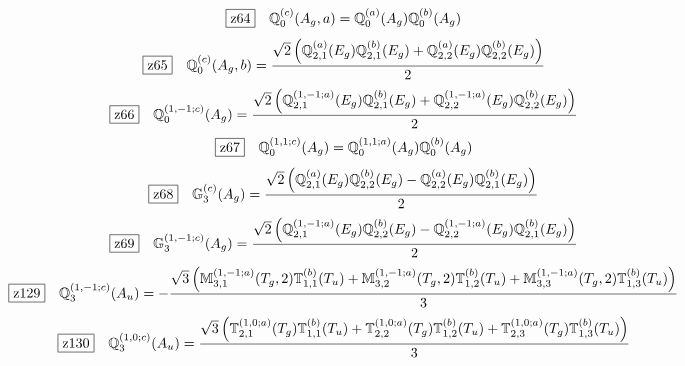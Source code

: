 \documentclass[fleqn,10pt,landscape]{jsarticle}
\begin{document}
\begin{dmath*}
\hspace*{3mm}\fbox{z64}\quad \mathbb{Q}_{0}^{(c)}(A_{g},a)=\mathbb{Q}_{0}^{(a)}(A_{g}) \mathbb{Q}_{0}^{(b)}(A_{g})
\end{dmath*}
\begin{dmath*}
\hspace*{3mm}\fbox{z65}\quad \mathbb{Q}_{0}^{(c)}(A_{g},b)=\frac{\sqrt{2} \left(\mathbb{Q}_{2,1}^{(a)}(E_{g}) \mathbb{Q}_{2,1}^{(b)}(E_{g}) + \mathbb{Q}_{2,2}^{(a)}(E_{g}) \mathbb{Q}_{2,2}^{(b)}(E_{g})\right)}{2}
\end{dmath*}
\begin{dmath*}
\hspace*{3mm}\fbox{z66}\quad \mathbb{Q}_{0}^{(1,-1;c)}(A_{g})=\frac{\sqrt{2} \left(\mathbb{Q}_{2,1}^{(1,-1;a)}(E_{g}) \mathbb{Q}_{2,1}^{(b)}(E_{g}) + \mathbb{Q}_{2,2}^{(1,-1;a)}(E_{g}) \mathbb{Q}_{2,2}^{(b)}(E_{g})\right)}{2}
\end{dmath*}
\begin{dmath*}
\hspace*{3mm}\fbox{z67}\quad \mathbb{Q}_{0}^{(1,1;c)}(A_{g})=\mathbb{Q}_{0}^{(1,1;a)}(A_{g}) \mathbb{Q}_{0}^{(b)}(A_{g})
\end{dmath*}
\begin{dmath*}
\hspace*{3mm}\fbox{z68}\quad \mathbb{G}_{3}^{(c)}(A_{g})=\frac{\sqrt{2} \left(\mathbb{Q}_{2,1}^{(a)}(E_{g}) \mathbb{Q}_{2,2}^{(b)}(E_{g}) - \mathbb{Q}_{2,2}^{(a)}(E_{g}) \mathbb{Q}_{2,1}^{(b)}(E_{g})\right)}{2}
\end{dmath*}
\begin{dmath*}
\hspace*{3mm}\fbox{z69}\quad \mathbb{G}_{3}^{(1,-1;c)}(A_{g})=\frac{\sqrt{2} \left(\mathbb{Q}_{2,1}^{(1,-1;a)}(E_{g}) \mathbb{Q}_{2,2}^{(b)}(E_{g}) - \mathbb{Q}_{2,2}^{(1,-1;a)}(E_{g}) \mathbb{Q}_{2,1}^{(b)}(E_{g})\right)}{2}
\end{dmath*}
\begin{dmath*}
\hspace*{3mm}\fbox{z129}\quad \mathbb{Q}_{3}^{(1,-1;c)}(A_{u})=- \frac{\sqrt{3} \left(\mathbb{M}_{3,1}^{(1,-1;a)}(T_{g},2) \mathbb{T}_{1,1}^{(b)}(T_{u}) + \mathbb{M}_{3,2}^{(1,-1;a)}(T_{g},2) \mathbb{T}_{1,2}^{(b)}(T_{u}) + \mathbb{M}_{3,3}^{(1,-1;a)}(T_{g},2) \mathbb{T}_{1,3}^{(b)}(T_{u})\right)}{3}
\end{dmath*}
\begin{dmath*}
\hspace*{3mm}\fbox{z130}\quad \mathbb{Q}_{3}^{(1,0;c)}(A_{u})=\frac{\sqrt{3} \left(\mathbb{T}_{2,1}^{(1,0;a)}(T_{g}) \mathbb{T}_{1,1}^{(b)}(T_{u}) + \mathbb{T}_{2,2}^{(1,0;a)}(T_{g}) \mathbb{T}_{1,2}^{(b)}(T_{u}) + \mathbb{T}_{2,3}^{(1,0;a)}(T_{g}) \mathbb{T}_{1,3}^{(b)}(T_{u})\right)}{3}
\end{dmath*}
\end{document}
